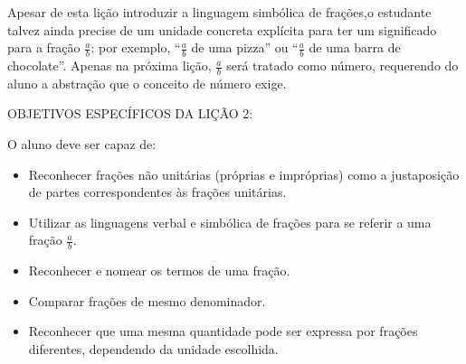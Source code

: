 Apesar de esta lição introduzir a linguagem simbólica de frações,o estudante talvez ainda precise de um unidade concreta explícita para ter um significado para a fração $\frac{a}{b}$: por exemplo, ``$\frac{a}{b}$ de uma pizza'' ou ``$\frac{a}{b}$ de uma barra de chocolate''. Apenas na próxima lição, $\frac{a}{b}$ será tratado como número, requerendo do aluno a abstração que o conceito de número exige.
\vspace{.15cm}

\noindent OBJETIVOS ESPECÍFICOS DA LIÇÃO 2:
\vspace{.15cm}

\noindent O aluno deve ser capaz de:
\begin{itemize}
 \item Reconhecer frações não unitárias (próprias e impróprias) como a justaposição de partes correspondentes às frações unitárias.
  \item  Utilizar as linguagens verbal e simbólica de frações para se referir a uma fração $\frac{a}{b}$.
  \item  Reconhecer e nomear os termos de uma fração.
  \item  Comparar frações de mesmo denominador.
  \item  Reconhecer que uma mesma quantidade pode ser expressa por frações diferentes, dependendo da unidade escolhida.
\end{itemize}


\pagebreak

